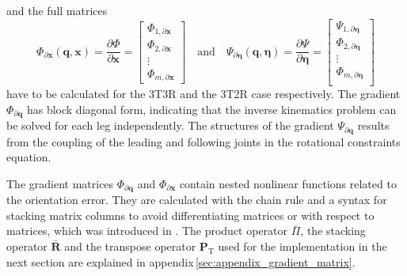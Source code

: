 \documentclass[robotics,article,accept,moreauthors,pdftex]{Definitions/mdpi}
\newcommand{\bm}[1]{\boldsymbol{#1}}
\newcommand{\transp}[0]{{\mathrm{T}}}
\let\Phi\varPhi
\let\Psi\varPsi
\begin{document}
%
and the full  matrices 
%
\begin{equation}
\bm{\Phi}_{\partial \bm{x}}(\bm{q},\bm{x})
=
\frac{\partial \bm{\Phi}}{\partial \bm{x}}
=
\begin{bmatrix}
\bm{\Phi}_{1,\partial\bm{x}} \\
\bm{\Phi}_{2,\partial\bm{x}} \\
\vdots \\
\bm{\Phi}_{m,\partial\bm{x}}
\end{bmatrix}
\quad
\mathrm{and}
\quad
\bm{\Psi}_{\partial \bm{\eta}}(\bm{q},\bm{\eta})
=
\frac{\partial \bm{\Psi}}{\partial \bm{\eta}}
=
\begin{bmatrix}
\bm{\Psi}_{1,\partial\bm{\eta}} \\
\bm{\Phi}_{2,\partial\bm{\eta}} \\
\vdots \\
\bm{\Phi}_{m,\partial\bm{\eta}} \\
\end{bmatrix}
\label{equ:PhiPsi_grad_x_complete}
\end{equation}
%
have to be calculated for the 3T3R and the 3T2R case respectively.
The gradient $\bm{\Phi}_{\partial \bm{q}}$ has block diagonal form, indicating that the inverse kinematics problem can be solved for each leg independently.
The structures of the gradient $\bm{\Psi}_{\partial \bm{q}}$ results from the coupling of the leading and following joints in the rotational constraints equation.

The gradient matrices $\bm{\Phi}_{\partial \bm{q}}$ and $\bm{\Phi}_{\partial \bm{x}}$ contain nested nonlinear functions related to the orientation error.
They are calculated with the chain rule and a syntax for stacking matrix columns to avoid differentiating matrices or with respect to matrices, which was introduced in \cite{1_SchapplerTapOrt2019}.
The product operator $\overline{\Pi}$, the stacking operator $\overline{\bm{R}}$ and the transpose operator $\bm{P}_\transp$ used for the implementation in the next section are explained in appendix\,\ref{sec:appendix_gradient_matrix}.
\end{document}
